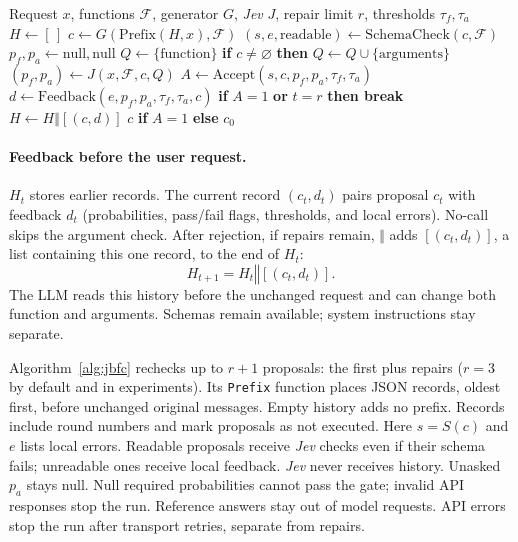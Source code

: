 \begin{algorithm}[t]
\caption{\textbf{DMFC}: verification and prompt repair}
\label{alg:jbfc}
\footnotesize
\begin{algorithmic}[1]
\Require Request $x$, functions $\mathcal{F}$, generator $G$, \textit{Jev} $J$,
\Statex \hspace{\algorithmicindent}repair limit $r$, thresholds $\tau_f,\tau_a$
\State $H\gets[\,]$
  \State $c\gets G(\mathrm{Prefix}(H,x),\mathcal{F})$
  \State $(s,e,\mathrm{readable})\gets\mathrm{SchemaCheck}(c,\mathcal{F})$
  \State $p_f,p_a\gets\mathrm{null},\mathrm{null}$
    \State $Q\gets\{\mathrm{function}\}$
    \State \textbf{if} $c\ne\varnothing$ \textbf{then} $Q\gets Q\cup\{\mathrm{arguments}\}$
    \State $(p_f,p_a)\gets J(x,\mathcal{F},c,Q)$
  \EndIf
  \State $A\gets\mathrm{Accept}(s,c,p_f,p_a,\tau_f,\tau_a)$ 
  \State $d\gets\mathrm{Feedback}(e,p_f,p_a,\tau_f,\tau_a,c)$
  \State \textbf{if} $A=1$ \textbf{or} $t=r$ \textbf{then break}
  \State $H\gets H\mathbin{\Vert}[(c,d)]$
\EndFor
\State \Return $c$ \textbf{if} $A=1$ \textbf{else} $c_0$ 
\end{algorithmic}
\end{algorithm}

\paragraph{Feedback before the user request.}
$H_t$ stores earlier records. The current record $(c_t,d_t)$ pairs proposal $c_t$ with feedback $d_t$ (probabilities, pass/fail flags, thresholds, and local errors). No-call skips the argument check. After rejection, if repairs remain, $\Vert$ adds $[(c_t,d_t)]$, a list containing this one record, to the end of $H_t$:
\begin{equation}
 H_{t+1}=H_t\mathbin{\Vert}[(c_t,d_t)].
\end{equation}
The LLM reads this history before the unchanged request and can change both function and arguments. Schemas remain available; system instructions stay separate.

Algorithm~\ref{alg:jbfc} rechecks up to $r+1$ proposals: the first plus repairs ($r=3$ by default and in experiments). Its \texttt{Prefix} function places JSON records, oldest first, before unchanged original messages. Empty history adds no prefix. Records include round numbers and mark proposals as not executed. Here $s=S(c)$ and $e$ lists local errors. Readable proposals receive \textit{Jev} checks even if their schema fails; unreadable ones receive local feedback. \textit{Jev} never receives history. Unasked $p_a$ stays null. Null required probabilities cannot pass the gate; invalid API responses stop the run. Reference answers stay out of model requests. API errors stop the run after transport retries, separate from repairs.

